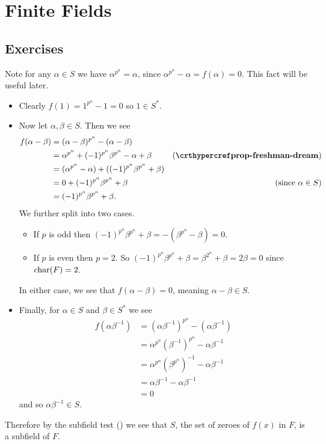 \section{Finite Fields}
\subsection*{Exercises}
\begin{questions}
    \item Note for any $\alpha \in S$ we have $\alpha^{p^n} = \alpha$, since $\alpha^{p^n} - \alpha = f(\alpha) = 0$. This fact will be useful later.
    \begin{itemize}
        \item Clearly $f(1) = 1^{p^n} - 1 = 0$ so $1 \in S^\ast$.

        \item Now let $\alpha,\beta \in S$. Then we see
        \begin{align*}
            f(\alpha - \beta) &= (\alpha-\beta)^{p^n} - (\alpha - \beta)\\
            &= \alpha^{p^n} + (-1)^{p^n}\beta^{p^n} - \alpha + \beta & (\myref{prop-freshman-dream})\\
            &= (\alpha^{p^n} - \alpha) + ((-1)^{p^n}\beta^{p^n} + \beta)\\
            &= 0 + (-1)^{p^n}\beta^{p^n} + \beta & (\text{since } \alpha \in S)\\
            &= (-1)^{p^n}\beta^{p^n} + \beta.
        \end{align*}
        We further split into two cases.
        \begin{itemize}
            \item If $p$ is odd then $(-1)^{p^n}\beta^{p^n} + \beta = -(\beta^{p^n} - \beta) = 0$.
            \item If $p$ is even then $p = 2$. So $(-1)^{p^n}\beta^{p^n} + \beta = \beta^{2^n} + \beta = 2\beta = 0$ since $\mathrm{char}(F) = 2$.
        \end{itemize}
        In either case, we see that $f(\alpha-\beta) = 0$, meaning $\alpha - \beta \in S$.

        \item Finally, for $\alpha \in S$ and $\beta \in S^\ast$ we see
        \begin{align*}
            f(\alpha\beta^{-1}) &= (\alpha\beta^{-1})^{p^n} - (\alpha\beta^{-1})\\
            &= \alpha^{p^n}\left(\beta^{-1}\right)^{p^n} - \alpha\beta^{-1}\\
            &= \alpha^{p^n}\left(\beta^{p^n}\right)^{-1} - \alpha\beta^{-1}\\
            &= \alpha\beta^{-1} - \alpha\beta^{-1}\\
            &= 0
        \end{align*}
        and so $\alpha\beta^{-1} \in S$.
    \end{itemize}
    Therefore by the subfield test () we see that $S$, the set of zeroes of $f(x)$ in $F$, is a subfield of $F$.


\end{questions}
